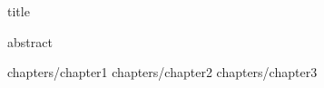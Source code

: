 \documentclass[12pt]{book}
\begin{document}
\frontmatter



{title}

{abstract}
\tableofcontents


\restoregeometry

\mainmatter


{chapters/chapter1}
{chapters/chapter2}
{chapters/chapter3}

	

\backmatter
\end{document}
